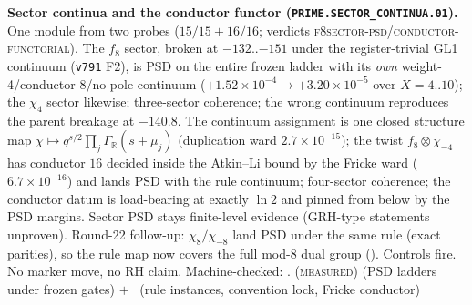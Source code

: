 \par\smallskip\noindent\textbf{Sector continua and the conductor
functor (\texttt{PRIME.SECTOR\_CONTINUA.01}).}
One module from two probes ($15/15+16/16$; verdicts
\textsc{f8sector-psd}/\textsc{conductor-functorial}).  The $f_8$
sector, broken at $-132..{-151}$ under the register-trivial GL1
continuum (\texttt{v791} F2), is PSD on the entire frozen ladder
with its \emph{own} weight-4/conductor-8/no-pole continuum
($+1.52\times10^{-4}\to+3.20\times10^{-5}$ over $X=4..10$); the
$\chi_4$ sector likewise; three-sector coherence; the wrong
continuum reproduces the parent breakage at $-140.8$.  The continuum
assignment is one closed structure map
$\chi\mapsto q^{s/2}\prod_j\Gamma_{\mathbb R}(s+\mu_j)$ (duplication
ward $2.7\times10^{-15}$); the twist $f_8\otimes\chi_{-4}$ has
conductor $16$ decided inside the Atkin--Li bound by the Fricke ward
($6.7\times10^{-16}$) and lands PSD with the rule continuum;
four-sector coherence; the conductor datum is load-bearing at
exactly $\ln 2$ and pinned from below by the PSD margins.  Sector
PSD stays finite-level evidence (GRH-type statements unproven).
Round-22 follow-up: $\chi_8/\chi_{-8}$ land PSD under the same
rule (exact parities), so the rule map now covers the full mod-8
dual group ().
Controls fire.  No marker move, no RH claim.
Machine-checked: .
(\textsc{measured}) (PSD ladders under frozen gates) $+$ \mE\
(rule instances, convention lock, Fricke conductor)
\par\smallskip


